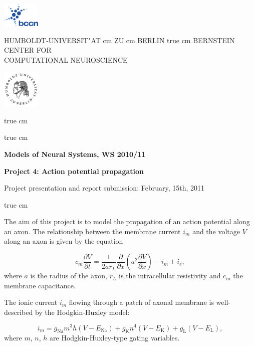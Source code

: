 \documentclass[12pt]{article}
\newcommand{\Na}{\mathrm{Na}}
\newcommand{\K}{\mathrm{K}}
\newcommand{\Leak}{\mathrm{L}}
\begin{document}
\parbox{2cm}{
\includegraphics[width=1.8cm]{../bccnlogo.pdf}
}
\parbox{11cm}{
\begin{center}
\large HUMBOLDT-UNIVERSIT"AT  cm ZU  cm BERLIN
 true cm
\mgross BERNSTEIN CENTER FOR\\ COMPUTATIONAL NEUROSCIENCE
\end{center}
}
\parbox{2cm}
{
\hfill
\includegraphics[width=1.8cm]{../hublogo.pdf}
}

 true cm



 true cm
\centerline{\bf Models of Neural Systems, WS 2010/11}
\centerline{\bf Project 4: Action potential propagation} 
\centerline{Project presentation and report submission: February,
15th, 2011}

 true cm


\noindent The aim of this project is to model the propagation of an action
potential along an axon. The relationship between the membrane current
$i_m$ and the voltage $V$ along an axon is given by the equation

\begin{equation}
    c_m\frac{\partial V}{\partial t} =
    \frac{1}{2ar_L}\frac{\partial}{\partial
    x}\left(a^2\frac{\partial V}{\partial x}\right)-i_m+i_e,
    \label{eq:Cable}
\end{equation}
where $a$ is the radius of the axon, $r_L$ is the intracellular
resistivity and $c_m$ the membrane capacitance.

The ionic current $i_m$ flowing through a patch of axonal membrane is
well-described by the Hodgkin-Huxley model:

\begin{equation}
    i_m=g_\Na m^3h(V-E_\Na)+g_\K n^4(V-E_\K)+g_\Leak(V-E_\Leak),
\end{equation}
where $m$, $n$, $h$ are Hodgkin-Huxley-type gating variables.
\end{document}
